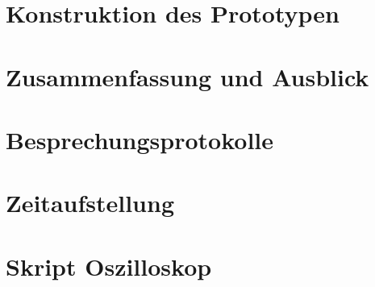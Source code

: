 \documentclass[paper=a4,12pt,pointlessnumbers,twoside]{scrreprt}
\begin{document}
\chapter{Konstruktion des Prototypen}

%

%

\chapter{Zusammenfassung und Ausblick}


\appendix
%

\chapter{Besprechungsprotokolle}


\chapter{Zeitaufstellung}



\chapter{Skript Oszilloskop}

\label{listing:osziskript}
%
%
%




\setcounter{lofdepth}{2}
\dipalistoffigures

\setcounter{lotdepth}{2}
\dipalistoftables

\newpage

\end{document}
